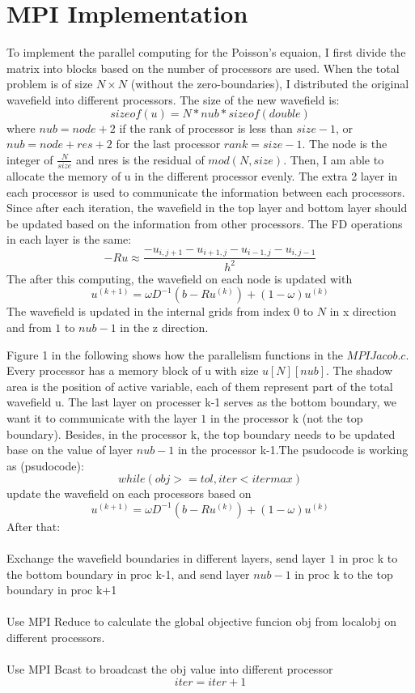 \documentclass[12pt]{article}
\begin{document}
\section{MPI Implementation}
To implement the parallel computing for the Poisson's equaion, I first divide the matrix into blocks based on the number of processors are used. When the total problem is of size $N\times N$ (without the zero-boundaries), I distributed the original wavefield into different processors. The size of the new wavefield is:
$$ sizeof(u) = N*nub*sizeof(double) $$
where $nub = node + 2$ if the rank of processor is less than $size-1$, or $ nub = node + res +2 $ for the last processor $rank = size -1$. The node is the integer of $ \frac{N}{size}$ and nres is the residual of $mod(N,size)$. Then, I am able to allocate the memory of u in the different processor evenly. The extra 2 layer in each processor is used to communicate the information between each processors. Since after each iteration, the wavefield in the top layer and bottom layer should be updated based on the information from other processors.
The FD operations in each layer is the same:
$$-Ru \approx \frac{-u_{i,j+1}-u_{i+1,j}-u_{i-1,j}-u_{i,j-1}}{h^2} $$
The after this computing, the wavefield on each node is updated with
$$u^{(k+1)} = \omega D^{-1}(b-Ru^{(k)}) + (1-\omega)u^{(k)}$$
The wavefield is updated in the internal grids from index $ 0 $ to $ N $ in x direction and from $1$ to $nub-1$ in the z direction.

Figure 1 in the following shows how the parallelism functions in the $MPIJacob.c$. Every processor has a memory block of u with size $u[N][nub]$. The shadow area is the position of active variable, each of them represent part of the total wavefield u. The last layer on processer k-1 serves as the bottom boundary, we want it to communicate with the layer $1$ in the processor k (not the top boundary). Besides, in the processor k, the top boundary needs to be updated base on the value of layer $nub-1$ in the processor k-1.The psudocode is working as (psudocode):
$$while (obj >= tol, iter < itermax) $$
update the wavefield on each processors based on
$$u^{(k+1)} = \omega D^{-1}(b-Ru^{(k)}) + (1-\omega)u^{(k)}$$
After that:\\\\
Exchange the wavefield boundaries in different layers, send layer $1$ in proc k to the bottom boundary in proc k-1, and send layer $nub-1$ in proc k to the top boundary in proc k+1\\\\
Use MPI Reduce to calculate the global objective funcion obj from localobj on different processors.\\\\
Use MPI Bcast to broadcast the obj value into different processor
$$iter = iter+1$$ 
\end{document}
